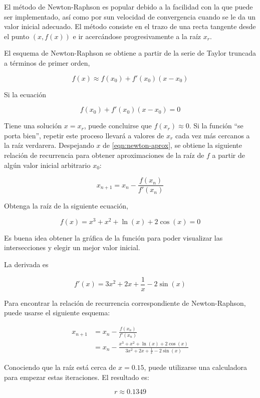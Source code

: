 El método de Newton-Raphson es popular debido a la facilidad con la que puede
ser implementado, así como por sun velocidad de convergencia cuando se le da un
valor inicial adecuado. El método consiste en el trazo de una recta tangente
desde el punto $(x, f(x))$ e ir acercándose progresivamente a la raíz $x_r$.

El esquema de Newton-Raphson se obtiene a partir de la serie de Taylor truncada
a términos de primer orden,

\[
	f(x) \approx f(x_0) + f'(x_0)(x - x_0)
\]

Si la ecuación

\begin{equation}
    f(x_0) + f'(x_0) (x - x_0) = 0 \label{eqn:newton-aprox}
\end{equation}

Tiene una solución $x = x_r$, puede concluirse que $f(x_r) \approx 0$. Si la
función ``se porta bien'', repetir este proceso llevará a valores de $x_r$ cada
vez más cercanos a la raíz verdarera. Despejando $x$ de \ref{eqn:newton-aprox},
se obtiene la siguiente relación de recurrencia para obtener aproximaciones de
la raíz de $f$ a partir de algún valor inicial arbitrario $x_0$:

\begin{equation}\label{eqn:newton}
    \boxed{x_{n+1} = x_n - \frac{f(x_n)}{f'(x_n)}}
\end{equation}

\begin{ex}
	Obtenga la raíz de la siguiente ecuación,

	\[
		f(x) = x^3 + x^2 + \ln(x) + 2 \cos(x) = 0
	\]

	\begin{solution}

        Es buena idea obtener la gráfica de la función para poder visualizar
        las intersecciones y elegir un mejor valor inicial.

		La derivada es 

		\[
			f'(x) = 3x^2 + 2x + \frac{1}{x} - 2 \sin(x)
		\]

        Para encontrar la relación de recurrencia correspondiente de
        Newton-Raphson, puede usarse el siguiente esquema:

		\begin{align*}
			x_{n+1} &= x_n - \frac{f(x_n)}{f'(x_n)} \\
				&= x_n - \frac{x^3 + x^2 + \ln(x) + 2
				\cos(x)}{3x^2 + 2x + \frac{1}{x} - 2 \sin(x)}
		\end{align*}

		Conociendo que la raíz está cerca de $x = 0.15$, puede utilizarse una
		calculadora para empezar estas iteraciones. El resultado es:

		\[
			\boxed{r \approx 0.1349}
		\]

	\end{solution}

\end{ex}

